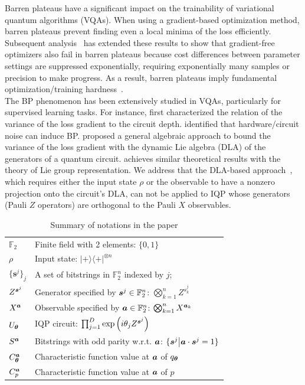 \documentclass[10pt, twocolumn, a4paper]{article}
\theoremstyle{plain}
\theoremstyle{definition}
\theoremstyle{remark}
\begin{document}
Barren plateaus have a significant impact on the trainability of variational quantum algorithms (VQAs). When using a gradient-based optimization method, barren plateaus prevent finding even a local minima of the loss efficiently. Subsequent analysis~\cite{Holmes22} has extended these results to show that gradient-free optimizers also fail in barren plateaus because cost differences between parameter settings are suppressed exponentially, requiring exponentially many samples or precision to make progress. As a result, barren plateaus imply fundamental optimization/training hardness~\cite{Larocca25}.\\
The BP phenomenon has been extensively studied in VQAs, particularly for supervised learning tasks. For instance, \citet{Cerezo21} first characterized the relation of the variance of the loss gradient to the circuit depth. \citet{Wang21} identified that hardware/circuit noise can induce BP. \citet{Ragone24} proposed a general algebraic approach to bound the variance of the loss gradient with the dynamic Lie algebra (DLA) of the generators of a quantum circuit. \citet{fontana2024characterizing} achieves similar theoretical results with the theory of Lie group representation. We address that the DLA-based approach~\cite{Ragone24}, which requires either the input state $\rho$ or the observable to have a nonzero projection onto the circuit's DLA, can not be applied to IQP whose generators (Pauli $Z$ operators) are orthogonal to the Pauli $X$ observables.

\begin{table}[t]
\centering
\caption{Summary of notations in the paper}
\label{tab:notation}
\setlength{\tabcolsep}{3pt}
\begin{tabular}{ll}
\toprule
$\mathbb{F}_2$ & Finite field with 2 elements: $\{0,1\}$\\
$\rho$ & Input state: $|+\rangle\!\langle+|^{\otimes n}$ \\
$\{\bm{s}^j\}_j$ & A set of bitstrings in $\mathbb{F}_2^n$ indexed by $j$; \\
$Z^{{\bm{s}}^j}$ & Generator specified by ${\bm{s}^j} \in \mathbb{F}_2^n $: $\bigotimes_{k=1}^n Z^{s^j_k} $\\
$X^{\bm{a}}$ & Observable specified by ${\bm{a}} \in \mathbb{F}_2^n$: $\bigotimes_{k=1}^n X^{{\bm{a}}_k} $\\
$U_{{\bm{\theta}}}$ & IQP circuit: $\prod_{j=1}^D \exp \left(i\theta_j Z^{{\bm{s}}^j}\right)$  \\
$S^{{\bm{a}}}$ & Bitstrings with odd parity w.r.t. ${\bm{a}}$: $\{ {\bm{s}^j} \big| {\bm{a}} \cdot {\bm{s}^j} = 1 \}$\\
$C^{{\bm{a}}}_{{\bm{\theta}}}$ & Characteristic function value at ${\bm{a}}$ of $q_{\bm{\theta}}$\\
$C^{{\bm{a}}}_p$ & Characteristic function value at ${\bm{a}}$ of $p$ \\
\bottomrule
\end{tabular}
\end{table}
\end{document}
